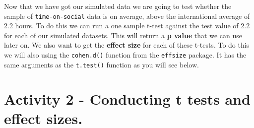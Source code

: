 \documentclass[
]{book}
\newenvironment{Shaded}{\begin{snugshade}}{\end{snugshade}}
\newcommand{\AttributeTok}[1]{\textcolor[rgb]{0.13,0.29,0.53}{#1}}
\newcommand{\CommentTok}[1]{\textcolor[rgb]{0.56,0.35,0.01}{\textit{#1}}}
\newcommand{\DecValTok}[1]{\textcolor[rgb]{0.00,0.00,0.81}{#1}}
\newcommand{\FunctionTok}[1]{\textcolor[rgb]{0.13,0.29,0.53}{\textbf{#1}}}
\newcommand{\NormalTok}[1]{#1}
\newcommand{\OtherTok}[1]{\textcolor[rgb]{0.56,0.35,0.01}{#1}}
\newcommand{\SpecialCharTok}[1]{\textcolor[rgb]{0.81,0.36,0.00}{\textbf{#1}}}
\begin{document}
\begin{Shaded}
\end{Shaded}

Now that we have got our simulated data we are going to test whether the sample of \texttt{time-on-social} data is on average, above the international average of 2.2 hours. To do this we can run a one sample t-test against the test value of 2.2 for each of our simulated datasets. This will return a \textbf{p value} that we can use later on. We also want to get the \textbf{effect size} for each of these t-tests. To do this we will also using the \texttt{cohen.d()} function from the \texttt{effsize} package. It has the same arguments as the \texttt{t.test()} function as you will see below.

\section{Activity 2 - Conducting t tests and effect sizes.}\label{activity-2---conducting-t-tests-and-effect-sizes.}
\end{document}
